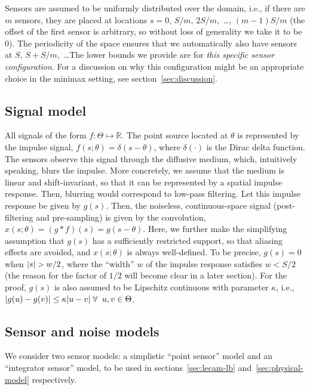 \documentclass[conference]{IEEEtran}
\DeclarePairedDelimiter\abs{\lvert}{\rvert}
\begin{document}
Sensors are assumed to be uniformly distributed over the domain, i.e., if there
are $m$ sensors, they are placed at locations $s = 0$, $S/m$, $2S/m$,~\dots,
$(m{-}1)S/m$ (the offset of the first sensor is arbitrary, so without loss of
generality we take it to be 0). The periodicity of the space ensures that we
automatically also have sensors at $S$, $S{+}S/m$,~\dots\@ The lower bounds we
provide are for \emph{this specific sensor configuration}. For a discussion on
why this configuration might be an appropriate choice in the minimax setting,
see section~\ref{sec:discussion}.

\subsection{Signal model}
\label{sec:signal-model}

All signals of the form $f:\Theta\mapsto\mathbb{R}$.  The point source located at $\theta$
is represented by the impulse signal, $f(s;\theta) = \delta(s - \theta)$, where
$\delta(\cdot)$ is the Dirac delta function.  The sensors observe this signal
through the diffusive medium, which, intuitively speaking, blurs the impulse.
More concretely, we assume that the medium is linear and shift-invariant, so
that it can be represented by a spatial impulse response. Then, blurring would
correspond to low-pass filtering.  Let this impulse response be given by
$g(s)$. Then, the noiseless, continuous-space signal (post-filtering and
pre-sampling) is given by the convolution, $x(s; \theta) = (g*f)(s) = g(s -
\theta)$. Here, we further make the simplifying assumption that $g(s)$ has a
sufficiently restricted support, so that aliasing effects are avoided, and
$x(s; \theta)$ is always well-defined. To be precise, $g(s) = 0$ when $\abs{s}
> w/2$, where the ``width'' $w$ of the impulse response satisfies $w < S / 2$
(the reason for the factor of $1/2$ will become clear in a later section). For
the proof, $g(s)$ is also assumed to be Lipschitz continuous with parameter
$\kappa$, i.e., $\abs{g(u) - g(v)} \leq \kappa \abs{u - v} \; \forall \;\; u, v
\in \Theta$.

\subsection{Sensor and noise models}
\label{sec:sensor-model}

We consider two sensor models: a simplistic ``point sensor'' model and an
``integrator sensor'' model, to be used in sections~\ref{sec:lecam-lb}
and~\ref{sec:physical-model} respectively.
\end{document}
